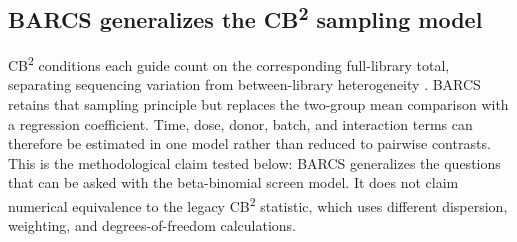 \subsection{\texorpdfstring{BARCS generalizes the CB\textsuperscript{2}
sampling model}{BARCS generalizes the CB2 sampling model}}
\label{sec:cb2-generalization}

CB\textsuperscript{2} conditions each guide count on the corresponding
full-library total, separating sequencing variation from between-library
heterogeneity \citep{jeong2019beta}.  BARCS retains that sampling principle but
replaces the two-group mean comparison with a regression coefficient.  Time,
dose, donor, batch, and interaction terms can therefore be estimated in one
model rather than reduced to pairwise contrasts.  This is the methodological
claim tested below: BARCS generalizes the questions that can be asked with the
beta-binomial screen model.  It does not claim numerical equivalence to the
legacy CB\textsuperscript{2} statistic, which uses different dispersion,
weighting, and degrees-of-freedom calculations.
